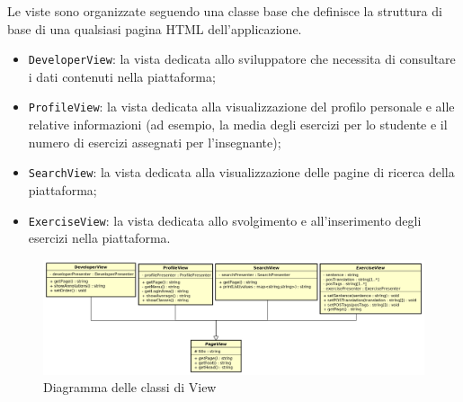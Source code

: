 Le viste sono organizzate seguendo una classe base che definisce la struttura di base di una qualsiasi pagina HTML dell'applicazione.
\begin{itemize}
	\item \texttt{DeveloperView}: la vista dedicata allo sviluppatore che necessita di consultare i dati contenuti nella piattaforma; 
	\item \texttt{ProfileView}: la vista dedicata alla visualizzazione del profilo personale e alle relative informazioni (ad esempio, la media degli esercizi per lo studente e il numero di esercizi assegnati per l'insegnante);
	\item \texttt{SearchView}: la vista dedicata alla visualizzazione delle pagine di ricerca della piattaforma;
	\item \texttt{ExerciseView}: la vista dedicata allo svolgimento e all'inserimento degli esercizi nella piattaforma.
\end{itemize}

\begin{figure}[h]
\includegraphics[scale=0.41]{images/View.png}
\caption{Diagramma delle classi di View}
\end{figure}
